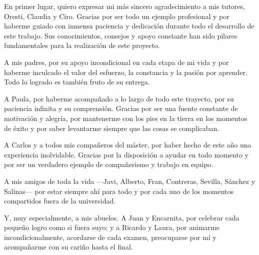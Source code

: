 
En primer lugar, quiero expresar mi más sincero agradecimiento a mis tutores, Oresti, Claudia y Ciro. Gracias por ser todo un ejemplo profesional y por haberme guiado con inmensa paciencia y dedicación durante todo el desarrollo de este trabajo. Sus conocimientos, consejos y apoyo constante han sido pilares fundamentales para la realización de este proyecto.

A mis padres, por su apoyo incondicional en cada etapa de mi vida y por haberme inculcado el valor del esfuerzo, la constancia y la pasión por aprender. Todo lo logrado es también fruto de su entrega.

A Paula, por haberme acompañado a lo largo de todo este trayecto, por su paciencia infinita y su comprensión. Gracias por ser una fuente constante de motivación y alegría, por mantenerme con los pies en la tierra en los momentos de éxito y por saber levantarme siempre que las cosas se complicaban.

A Carlos y a todos mis compañeros del máster, por haber hecho de este año una experiencia inolvidable. Gracias por la disposición a ayudar en todo momento y por ser un verdadero ejemplo de compañerismo y trabajo en equipo.

A mis amigos de toda la vida —Javi, Alberto, Fran, Contreras, Sevilla, Sánchez y Salinas— por estar siempre ahí para todo y por cada uno de los momentos compartidos fuera de la universidad.

Y, muy especialmente, a mis abuelos. A Juan y Encarnita, por celebrar cada pequeño logro como si fuera suyo; y a Ricardo y Laura, por animarme incondicionalmente, acordarse de cada examen, preocuparse por mí y acompañarme con su cariño hasta el final.